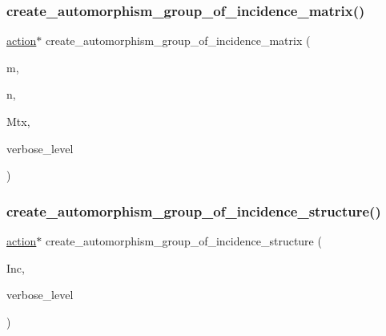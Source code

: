 \subsubsection{\texorpdfstring{create\+\_\+automorphism\+\_\+group\+\_\+of\+\_\+incidence\+\_\+matrix()}{create\_automorphism\_group\_of\_incidence\_matrix()}}
{\footnotesize\ttfamily \mbox{\hyperlink{classaction}{action}}$\ast$ create\+\_\+automorphism\+\_\+group\+\_\+of\+\_\+incidence\+\_\+matrix (\begin{DoxyParamCaption}\item[{\mbox{\hyperlink{galois_8h_a09fddde158a3a20bd2dcadb609de11dc}{I\+NT}}}]{m,  }\item[{\mbox{\hyperlink{galois_8h_a09fddde158a3a20bd2dcadb609de11dc}{I\+NT}}}]{n,  }\item[{\mbox{\hyperlink{galois_8h_a09fddde158a3a20bd2dcadb609de11dc}{I\+NT}} $\ast$}]{Mtx,  }\item[{\mbox{\hyperlink{galois_8h_a09fddde158a3a20bd2dcadb609de11dc}{I\+NT}}}]{verbose\+\_\+level }\end{DoxyParamCaption})}

\mbox{\label{action__global_8_c_ad0da83975a94cb8a5fdc21b50f6e60ce}} 
\subsubsection{\texorpdfstring{create\+\_\+automorphism\+\_\+group\+\_\+of\+\_\+incidence\+\_\+structure()}{create\_automorphism\_group\_of\_incidence\_structure()}}
{\footnotesize\ttfamily \mbox{\hyperlink{classaction}{action}}$\ast$ create\+\_\+automorphism\+\_\+group\+\_\+of\+\_\+incidence\+\_\+structure (\begin{DoxyParamCaption}\item[{\mbox{\hyperlink{classincidence__structure}{incidence\+\_\+structure}} $\ast$}]{Inc,  }\item[{\mbox{\hyperlink{galois_8h_a09fddde158a3a20bd2dcadb609de11dc}{I\+NT}}}]{verbose\+\_\+level }\end{DoxyParamCaption})}

